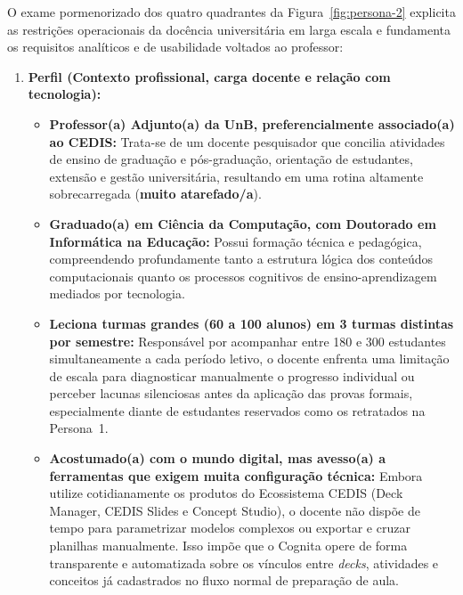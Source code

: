 O exame pormenorizado dos quatro quadrantes da Figura~\ref{fig:persona-2} explicita as restrições operacionais da docência universitária em larga escala e fundamenta os requisitos analíticos e de usabilidade voltados ao professor:

\begin{enumerate}
    \item \textbf{Perfil (Contexto profissional, carga docente e relação com tecnologia):}
    \begin{itemize}
        \item \textbf{Professor(a) Adjunto(a) da UnB, preferencialmente associado(a) ao CEDIS:} Trata-se de um docente pesquisador que concilia atividades de ensino de graduação e pós-graduação, orientação de estudantes, extensão e gestão universitária, resultando em uma rotina altamente sobrecarregada (\textbf{muito atarefado/a}).
        \item \textbf{Graduado(a) em Ciência da Computação, com Doutorado em Informática na Educação:} Possui formação técnica e pedagógica, compreendendo profundamente tanto a estrutura lógica dos conteúdos computacionais quanto os processos cognitivos de ensino-aprendizagem mediados por tecnologia.
        \item \textbf{Leciona turmas grandes (60 a 100 alunos) em 3 turmas distintas por semestre:} Responsável por acompanhar entre 180 e 300 estudantes simultaneamente a cada período letivo, o docente enfrenta uma limitação de escala para diagnosticar manualmente o progresso individual ou perceber lacunas silenciosas antes da aplicação das provas formais, especialmente diante de estudantes reservados como os retratados na Persona~1.
        \item \textbf{Acostumado(a) com o mundo digital, mas avesso(a) a ferramentas que exigem muita configuração técnica:} Embora utilize cotidianamente os produtos do Ecossistema CEDIS (Deck Manager, CEDIS Slides e Concept Studio), o docente não dispõe de tempo para parametrizar modelos complexos ou exportar e cruzar planilhas manualmente. Isso impõe que o Cognita opere de forma transparente e automatizada sobre os vínculos entre \textit{decks}, atividades e conceitos já cadastrados no fluxo normal de preparação de aula.
    \end{itemize}


\end{enumerate}
